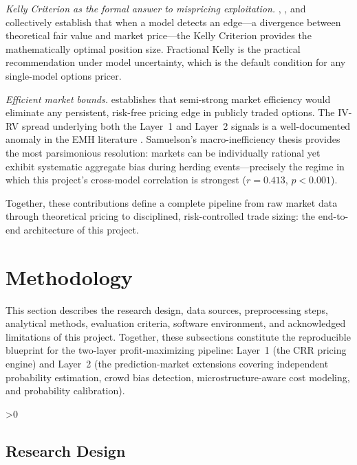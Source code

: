 \documentclass[12pt, letterpaper]{article}
\let\oldsection\section
\renewcommand{\section}{\clearpage\oldsection}
\let\oldsubsection\subsection
\renewcommand{\subsection}{%
  \ifnum\value{subsection}>0 \clearpage\fi
  \oldsubsection
}
\begin{document}
\textit{Kelly Criterion as the formal answer to mispricing
exploitation.} \citet{Kelly1956}, \citet{Thorp1969}, and
\citet{MacLean2010} collectively establish that when a model detects
an edge---a divergence between theoretical fair value and market
price---the Kelly Criterion provides the mathematically optimal
position size. Fractional Kelly is the practical recommendation under
model uncertainty, which is the default condition for any
single-model options pricer.

\newpage
\textit{Efficient market bounds.} \citet{Fama1970} establishes that
semi-strong market efficiency would eliminate any persistent, risk-free
pricing edge in publicly traded options. The IV-RV spread underlying
both the Layer~1 and Layer~2 signals is a well-documented anomaly in
the EMH literature \citep{Carr2009}. Samuelson's macro-inefficiency
thesis provides the most parsimonious resolution: markets can be
individually rational yet exhibit systematic aggregate bias during
herding events---precisely the regime in which this project's
cross-model correlation is strongest ($r = 0.413$, $p < 0.001$).

Together, these contributions define a complete pipeline from raw
market data through theoretical pricing to disciplined, risk-controlled
trade sizing: the end-to-end architecture of this project.


\clearpage
\section{Methodology}

This section describes the research design, data sources, preprocessing
steps, analytical methods, evaluation criteria, software environment,
and acknowledged limitations of this project. Together, these
subsections constitute the reproducible blueprint for the two-layer
profit-maximizing pipeline: Layer~1 (the CRR pricing engine) and
Layer~2 (the prediction-market extensions covering independent
probability estimation, crowd bias detection, microstructure-aware
cost modeling, and probability calibration).

\subsection{Research Design}
\end{document}
